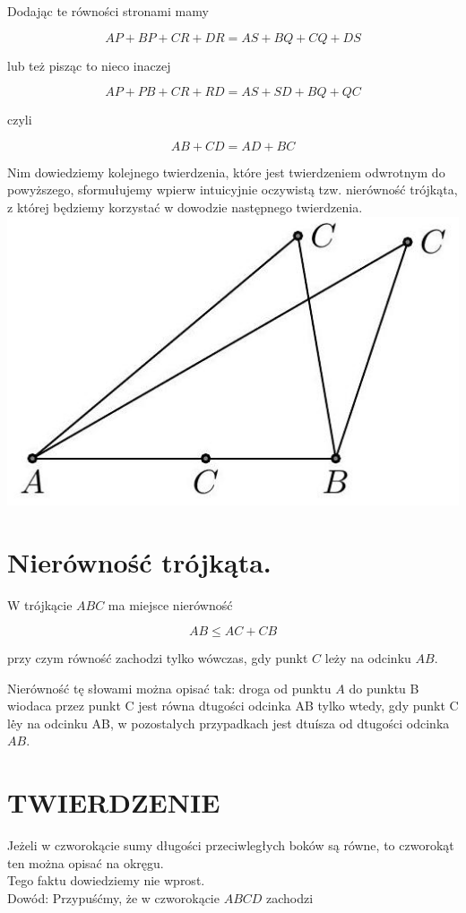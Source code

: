 \documentclass[10pt]{article}
\begin{document}
Dodając te równości stronami mamy

\[
A P+B P+C R+D R=A S+B Q+C Q+D S
\]

lub też pisząc to nieco inaczej

\[
A P+P B+C R+R D=A S+S D+B Q+Q C
\]

czyli

\[
A B+C D=A D+B C
\]

Nim dowiedziemy kolejnego twierdzenia, które jest twierdzeniem odwrotnym do powyższego, sformułujemy wpierw intuicyjnie oczywistą tzw. nierówność trójkąta, z której będziemy korzystać w dowodzie następnego twierdzenia.\\
\includegraphics[max width=\textwidth, center]{2024_11_21_e9b4faa005d5be2cc318g-049(1)}

\section*{Nierówność trójkąta.}
W trójkącie \(A B C\) ma miejsce nierówność

\[
A B \leqslant A C+C B
\]

przy czym równość zachodzi tylko wówczas, gdy punkt \(C\) leży na odcinku \(A B\).

Nierówność tę słowami można opisać tak: droga od punktu \(A\) do punktu B wiodaca przez punkt C jest równa dtugości odcinka AB tylko wtedy, gdy punkt C lė̇y na odcinku AB, w pozostalych przypadkach jest dtuísza od dtugości odcinka \(A B\).

\section*{TWIERDZENIE}
Jeżeli w czworokącie sumy długości przeciwległych boków są równe, to czworokąt ten można opisać na okręgu.\\
Tego faktu dowiedziemy nie wprost.\\
Dowód: Przypuśćmy, że w czworokącie \(A B C D\) zachodzi
\end{document}
